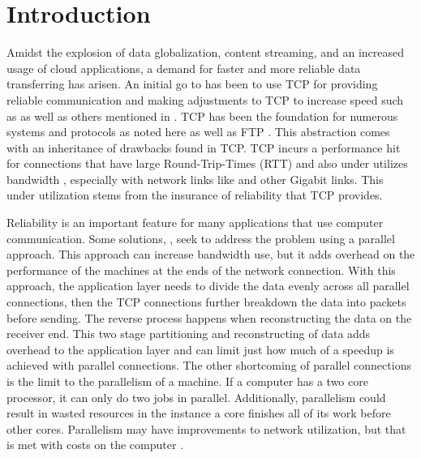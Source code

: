 \chapter{Introduction}

Amidst the explosion of data globalization, content streaming, and an increased usage of cloud applications, a demand for faster and more reliable data transferring has arisen. An initial go to has been to use TCP for providing reliable communication and making adjustments to TCP to increase speed such as \cite{brakmo1995tcp}\cite{wei2006fast}\cite{ha2008cubic} as well as others mentioned in \cite{ha2008cubic}\cite{He2002}. TCP has been the foundation for numerous systems and protocols as noted here \cite{Fan2010} as well as FTP \cite{Bhushan1972}. This abstraction comes with an inheritance of drawbacks found in TCP. TCP incurs a performance hit for connections that have large Round-Trip-Times (RTT) and also under utilizes bandwidth \cite{Fan2010}, especially with network links like \cite{Pfister2001} and other Gigabit links. This under utilization stems from the insurance of reliability that TCP provides.

Reliability is an important feature for many applications that use computer communication. Some solutions, \cite{Allman1995}\cite{Allman1997}\cite{Sivakumar2000psockets}, seek to address the problem using a parallel approach. This approach can increase bandwidth use, but it adds overhead on the performance of the machines at the ends of the network connection. With this approach, the application layer needs to divide the data evenly across all parallel connections, then the TCP connections further breakdown the data into packets before sending. The reverse process happens when reconstructing the data on the receiver end. This two stage partitioning and reconstructing of data adds overhead to the application layer and can limit just how much of a speedup is achieved with parallel connections. The other shortcoming of parallel connections is the limit to the parallelism of a machine. If a computer has a two core processor, it can only do two jobs in parallel. Additionally, parallelism could result in wasted resources in the instance a core finishes all of its work before other cores. Parallelism may have improvements to network utilization, but that is met with costs on the computer \cite{Leijen2009}.

